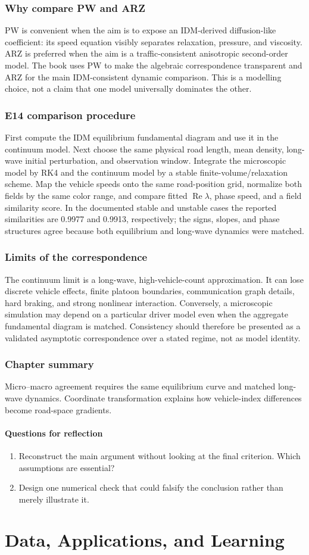\documentclass[11pt,a4paper,openany]{book}
\numberwithin{equation}{chapter}
\numberwithin{figure}{chapter}
\numberwithin{table}{chapter}
\newcommand{\chapterend}[1]{\section*{Chapter summary}\addcontentsline{toc}{section}{Chapter summary}\begin{tcolorbox}[resultbox]#1\end{tcolorbox}\subsection*{Questions for reflection}\begin{enumerate}[leftmargin=1.7em]\item Reconstruct the main argument without looking at the final criterion. Which assumptions are essential?\item Design one numerical check that could falsify the conclusion rather than merely illustrate it.\end{enumerate}\clearpage}
\newcommand{\Rea}{\operatorname{Re}}
\begin{document}
\section{Why compare PW and ARZ}
PW is convenient when the aim is to expose an IDM-derived diffusion-like coefficient: its speed equation visibly separates relaxation, pressure, and viscosity. ARZ is preferred when the aim is a traffic-consistent anisotropic second-order model. The book uses PW to make the algebraic correspondence transparent and ARZ for the main IDM-consistent dynamic comparison. This is a modelling choice, not a claim that one model universally dominates the other.

\section{E14 comparison procedure}
First compute the IDM equilibrium fundamental diagram and use it in the continuum model. Next choose the same physical road length, mean density, long-wave initial perturbation, and observation window. Integrate the microscopic model by RK4 and the continuum model by a stable finite-volume/relaxation scheme. Map the vehicle speeds onto the same road-position grid, normalize both fields by the same color range, and compare fitted $\Rea\lambda$, phase speed, and a field similarity score. In the documented stable and unstable cases the reported similarities are 0.9977 and 0.9913, respectively; the signs, slopes, and phase structures agree because both equilibrium and long-wave dynamics were matched.

\section{Limits of the correspondence}
The continuum limit is a long-wave, high-vehicle-count approximation. It can lose discrete vehicle effects, finite platoon boundaries, communication graph details, hard braking, and strong nonlinear interaction. Conversely, a microscopic simulation may depend on a particular driver model even when the aggregate fundamental diagram is matched. Consistency should therefore be presented as a validated asymptotic correspondence over a stated regime, not as model identity.

\chapterend{Micro--macro agreement requires the same equilibrium curve and matched long-wave dynamics. Coordinate transformation explains how vehicle-index differences become road-space gradients.}

\part{Data, Applications, and Learning}
\end{document}
